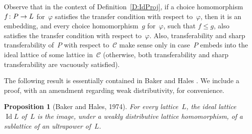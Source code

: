 \documentclass[reqno]{amsart}
\numberwithin{equation}{section}
\theoremstyle{plain}
\newtheorem{proposition}[theorem]{Proposition}
\theoremstyle{definition}
\theoremstyle{remark}
\numberwithin{figure}{section}
\numberwithin{table}{section}
\begin{document}
Observe that in the context of Definition~\ref{D:IdProj}, if a choice homomorphism $f\colon P\to\nobreak L$ for~${\varphi}$ satisfies the transfer condition with respect to~${\varphi}$, then it is an embedding, and every choice homomorphism~$g$ for~${\varphi}$, such that $f\leq g$, also satisfies the transfer condition with respect to~${\varphi}$.
Also, transferability and sharp transferability of~$P$ with respect to~${\mathcal{C}}$ make sense only in case~$P$ embeds into the ideal lattice of some lattice in~${\mathcal{C}}$ (otherwise, both transferability and sharp transferability are vacuously satisfied).

The following result is essentially contained in Baker and Hales \cite[Theorem~A]{BakHal74}.
We include a proof, with an amendment regarding weak distributivity, for convenience.

\begin{proposition}[Baker and Hales, 1974]\label{P:BaHaRepr}
For every lattice~$L$, the ideal lattice~$\operatorname{Id} L$ of~$L$ is the image, under a weakly distributive lattice homomorphism, of a sublattice of an ultrapower of~$L$.
\end{proposition}
\end{document}
